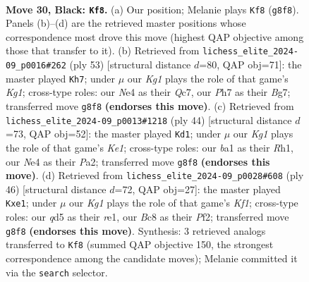 \documentclass[11pt]{article}
\begin{document}
\clearpage

\begin{figure}[p]\centering
\begin{subfigure}{0.46\textwidth}\centering
\resizebox{\linewidth}{!}{%
\newchessgame
\chessboard[
  setfen={r1b3k1/1p2q2p/2r5/1R1Q2p1/p1N1n3/4P1P1/P4PKP/B3R3 b - - 2 30},
  showmover=false,
  pgfstyle=straightmove, color=movearrow, markmove={g8-f8}
]}
\caption{}
\end{subfigure}\hfill
\begin{subfigure}{0.46\textwidth}\centering
\resizebox{\linewidth}{!}{%
\newchessgame
\chessboard[
  setfen={2r3k1/2q3b1/3p2pp/N2Qpp2/2P5/3nP1P1/5PBP/5RK1 b - - 1 27},
  showmover=false,
  pgfstyle=straightmove, color=movearrow, markmove={g8-h7}
]}
\caption{}
\end{subfigure}
\\[4pt]
\begin{subfigure}{0.46\textwidth}\centering
\resizebox{\linewidth}{!}{%
\newchessgame
\chessboard[
  setfen={r3rnk1/ppp2p2/4P1p1/8/1PB1p1P1/4q2P/PQ1N4/R3K2R w KQ - 0 23},
  showmover=false,
  pgfstyle=straightmove, color=movearrow, markmove={e1-d1}
]}
\caption{}
\end{subfigure}\hfill
\begin{subfigure}{0.46\textwidth}\centering
\resizebox{\linewidth}{!}{%
\newchessgame
\chessboard[
  setfen={5r1k/p2p2pp/1pnP1q2/3Q1pN1/7P/2P4R/5PP1/4rK2 w - - 0 24},
  showmover=false,
  pgfstyle=straightmove, color=movearrow, markmove={f1-e1}
]}
\caption{}
\end{subfigure}
\caption{\textbf{Move 30, Black: \texttt{Kf8}.} (a) Our position; Melanie plays \texttt{Kf8} (\texttt{g8f8}). Panels (b)--(d) are the retrieved master positions whose correspondence most drove this move (highest QAP objective among those that transfer to it). (b) Retrieved from \texttt{lichess\_elite\_2024-09\_p0016\#262} (ply 53) [structural distance $d$=80, QAP obj=71]: the master played \texttt{Kh7}; under $\mu$ our \emph{Kg1} plays the role of that game's \emph{Kg1}; cross-type roles: our \emph{N}e4 as their \emph{Q}c7, our \emph{P}h7 as their \emph{B}g7; transferred move \texttt{g8f8} \textbf{(endorses this move)}. (c) Retrieved from \texttt{lichess\_elite\_2024-09\_p0013\#1218} (ply 44) [structural distance $d$=73, QAP obj=52]: the master played \texttt{Kd1}; under $\mu$ our \emph{Kg1} plays the role of that game's \emph{Ke1}; cross-type roles: our \emph{b}a1 as their \emph{R}h1, our \emph{N}e4 as their \emph{P}a2; transferred move \texttt{g8f8} \textbf{(endorses this move)}. (d) Retrieved from \texttt{lichess\_elite\_2024-09\_p0028\#608} (ply 46) [structural distance $d$=72, QAP obj=27]: the master played \texttt{Kxe1}; under $\mu$ our \emph{Kg1} plays the role of that game's \emph{Kf1}; cross-type roles: our \emph{q}d5 as their \emph{r}e1, our \emph{B}c8 as their \emph{P}f2; transferred move \texttt{g8f8} \textbf{(endorses this move)}. Synthesis: 3 retrieved analogs transferred to \texttt{Kf8} (summed QAP objective 150, the strongest correspondence among the candidate moves); Melanie committed it via the \texttt{search} selector.}
\label{fig:thought-m59}
\end{figure}
\end{document}
